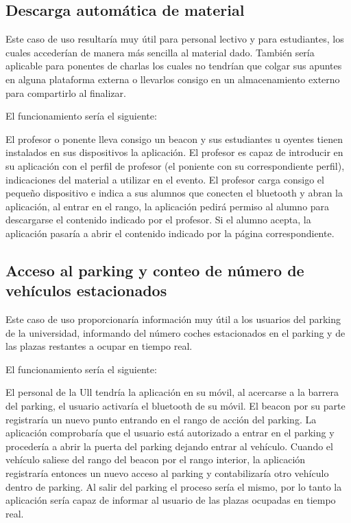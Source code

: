 \subsection{Descarga automática de material}

Este caso de uso resultaría muy útil para personal lectivo y para estudiantes, los cuales accederían de manera más sencilla al material dado. También sería aplicable para ponentes de charlas los cuales no tendrían que colgar sus apuntes en alguna plataforma externa o llevarlos consigo en  un almacenamiento externo para compartirlo al finalizar.

El funcionamiento sería el siguiente: 


El profesor o ponente lleva consigo un beacon y sus estudiantes u oyentes tienen instalados en sus dispositivos la aplicación. El profesor es capaz de introducir en su aplicación con el perfil de profesor (el poniente con su correspondiente perfil), indicaciones del material a utilizar en el evento. El profesor carga consigo el pequeño dispositivo e indica a sus alumnos que conecten el bluetooth y abran la aplicación, al entrar en el rango, la aplicación pedirá permiso al alumno para descargarse el contenido indicado por el profesor. Si el alumno acepta, la aplicación pasaría a abrir  el contenido indicado por la página correspondiente.


\subsection{Acceso al parking y conteo de número de vehículos estacionados}


Este caso de uso proporcionaría información muy útil a los usuarios del parking de la universidad, informando del número coches estacionados en el parking y de las plazas restantes a ocupar en tiempo real.

El funcionamiento sería el siguiente: 


El personal de la Ull tendría la aplicación en su móvil, al acercarse a la barrera del parking, el usuario activaría el bluetooth de su móvil. El beacon por su parte registraría un nuevo punto entrando en el rango de acción del parking. La aplicación comprobaría que el usuario está autorizado a entrar en el parking y procedería a abrir la puerta del parking dejando entrar al vehículo. Cuando el vehículo saliese del rango del beacon por el rango interior, la aplicación registraría entonces un nuevo acceso al parking y contabilizaría otro vehículo dentro de parking. Al salir del parking el proceso sería el mismo, por lo tanto la aplicación sería capaz de informar al usuario de las plazas ocupadas en tiempo real.


